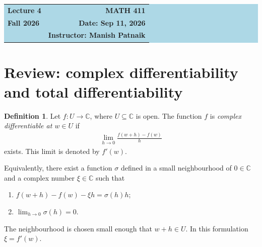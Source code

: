 \documentclass[11pt]{article}
\theoremstyle{plain}
\theoremstyle{definition}
\newtheorem{definition}[theorem]{Definition}
\theoremstyle{remark}
\numberwithin{equation}{section}
\newcommand{\be}{\begin{eqnarray}}
\newcommand{\ee}{\end{eqnarray}}
\newcommand{\C}{\mathbb{C}}
\begin{document}
\begin{center}
  \colorbox{lightblue}{%
    \begin{minipage}{0.94\textwidth}
      \vspace{0.55em}
      \begin{tabular*}{\textwidth}{@{\extracolsep{\fill}}lr}
        {\color{courseblue}\bfseries\LARGE Lecture 4} &
        {\color{courseblue}\bfseries\LARGE MATH 411}\\[0.35em]
        \textbf{Fall 2026} & \textbf{Date: Sep 11, 2026}\\
        & \textbf{Instructor: Manish Patnaik}
      \end{tabular*}
      \vspace{0.45em}
    \end{minipage}}
\end{center}

\setcounter{tocdepth}{1}
\tableofcontents
\vspace{0.45em}



\section{Review: complex differentiability and total differentiability}
\begin{definition}
Let $f:U\to\C$, where $U\subseteq\C$ is open. The function $f$ is
\emph{complex differentiable at $w\in U$} if
\be
 \lim_{h\to0}\frac{f(w+h)-f(w)}{h}
\ee
exists. This limit is denoted by $f'(w)$.

Equivalently, there exist a function $\sigma$ defined in a small
neighbourhood of $0\in\C$ and a complex number $\xi\in\C$ such that
\begin{enumerate}
\item $f(w+h)-f(w)-\xi h=\sigma(h)h$;
\item $\displaystyle\lim_{h\to0}\sigma(h)=0$.
\end{enumerate}
The neighbourhood is chosen small enough that $w+h\in U$.
In this formulation $\xi=f'(w)$.
\end{definition}
\end{document}
